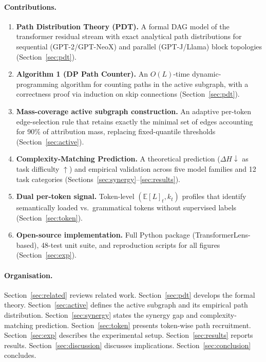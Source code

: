 \documentclass{article}
\newcommand{\E}{\mathbb{E}}
\newcommand{\DeltaH}{\Delta H}
\begin{document}
\paragraph{Contributions.}
\begin{enumerate}
  \item \textbf{Path Distribution Theory (PDT).}  A formal DAG model of the
        transformer residual stream with exact analytical path distributions for
        sequential (GPT-2/GPT-NeoX) and parallel (GPT-J/Llama) block topologies
        (Section~\ref{sec:pdt}).
  \item \textbf{Algorithm 1 (DP Path Counter).}  An $O(L)$-time dynamic-programming
        algorithm for counting paths in the active subgraph, with a correctness
        proof via induction on skip connections (Section~\ref{sec:pdt}).
  \item \textbf{Mass-coverage active subgraph construction.}  An adaptive per-token
        edge-selection rule that retains exactly the minimal set of edges accounting
        for 90\% of attribution mass, replacing fixed-quantile thresholds
        (Section~\ref{sec:active}).
  \item \textbf{Complexity-Matching Prediction.}  A theoretical prediction ($\DeltaH
        \downarrow$ as task difficulty $\uparrow$) and empirical validation across
        five model families and 12 task categories (Sections~\ref{sec:synergy}--\ref{sec:results}).
  \item \textbf{Dual per-token signal.}  Token-level $(\E[L]_t, k_t)$ profiles that
        identify semantically loaded vs.\ grammatical tokens without supervised labels
        (Section~\ref{sec:token}).
  \item \textbf{Open-source implementation.}  Full Python package (TransformerLens-based),
        48-test unit suite, and reproduction scripts for all figures (Section~\ref{sec:exp}).
\end{enumerate}

\paragraph{Organisation.}
Section~\ref{sec:related} reviews related work.  Section~\ref{sec:pdt} develops
the formal theory.  Section~\ref{sec:active} defines the active subgraph and
its empirical path distribution.  Section~\ref{sec:synergy} states the
synergy gap and complexity-matching prediction.  Section~\ref{sec:token} presents
token-wise path recruitment.  Section~\ref{sec:exp} describes the experimental
setup.  Section~\ref{sec:results} reports results.  Section~\ref{sec:discussion}
discusses implications.  Section~\ref{sec:conclusion} concludes.
\end{document}
